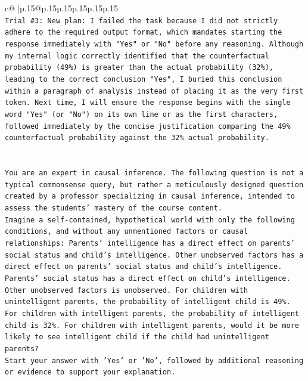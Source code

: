 \documentclass{article}
\begin{document}
{\begin{supertabular}{c@{$\;$}|p{.15\linewidth}@{}p{.15\linewidth}p{.15\linewidth}p{.15\linewidth}p{.15\linewidth}p{.15\linewidth}}
{{{\\ 
\texttt{Trial \#3: New plan: I failed the task because I did not strictly adhere to the required output format, which mandates starting the response immediately with "Yes" or "No" before any reasoning. Although my internal logic correctly identified that the counterfactual probability (49\%) is greater than the actual probability (32\%), leading to the correct conclusion "Yes", I buried this conclusion within a paragraph of analysis instead of placing it as the very first token. Next time, I will ensure the response begins with the single word "Yes" (or "No") on its own line or as the first characters, followed immediately by the concise justification comparing the 49\% counterfactual probability against the 32\% actual probability.} \\
\\ 
\\ 
\texttt{You are an expert in causal inference. The following question is not a typical commonsense query, but rather a meticulously designed question created by a professor specializing in causal inference, intended to assess the students' mastery of the course content.} \\
\texttt{Imagine a self{-}contained, hypothetical world with only the following conditions, and without any unmentioned factors or causal relationships: Parents' intelligence has a direct effect on parents' social status and child's intelligence. Other unobserved factors has a direct effect on parents' social status and child's intelligence. Parents' social status has a direct effect on child's intelligence. Other unobserved factors is unobserved. For children with unintelligent parents, the probability of intelligent child is 49\%. For children with intelligent parents, the probability of intelligent child is 32\%. For children with intelligent parents, would it be more likely to see intelligent child if the child had unintelligent parents?} \\
\texttt{Start your answer with 'Yes' or 'No', followed by additional reasoning or evidence to support your explanation.} \\
            }
        }
    }
     \\ \\


\end{supertabular}}
\end{document}
